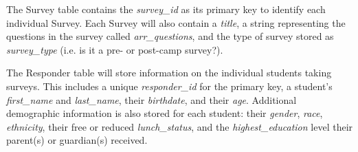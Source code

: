 \documentclass[letterpaper,10pt,serif,draftclsnofoot,onecolumn,compsoc,titlepage]{IEEEtran}
\begin{document}
The Survey table contains the \emph{survey\_id} as its primary key to identify each individual Survey.
Each Survey will also contain a \emph{title}, a string representing the questions in the survey called \emph{arr\_questions}, and the type of survey stored as \emph{survey\_type} (i.e. is it a pre- or post-camp survey?).

The Responder table will store information on the individual students taking surveys.
This includes a unique \emph{responder\_id} for the primary key, a student's \emph{first\_name} and \emph{last\_name}, their \emph{birthdate}, and their \emph{age}.
Additional demographic information is also stored for each student: their \emph{gender}, \emph{race}, \emph{ethnicity}, their free or reduced \emph{lunch\_status}, and the \emph{highest\_education} level their parent(s) or guardian(s) received.
\end{document}
